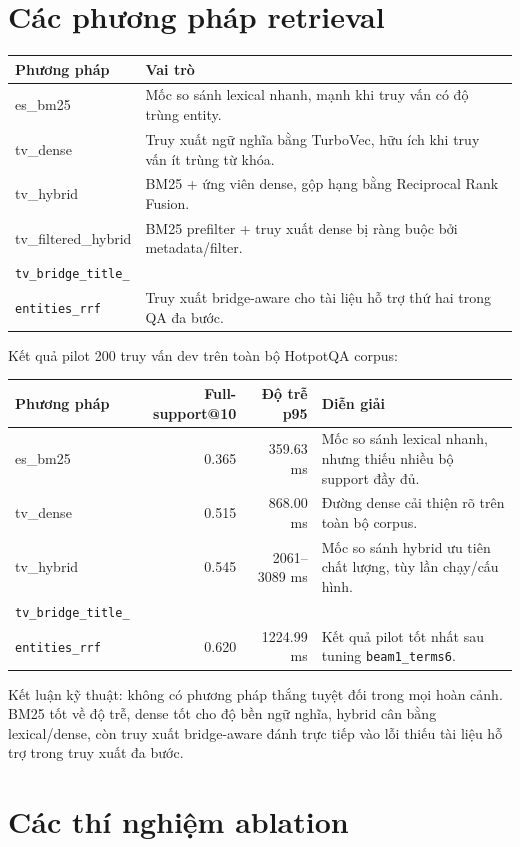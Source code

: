 \documentclass[11pt,a4paper]{article}
\newcommand{\bridgecell}{\texttt{tv\_bridge\_title\_}\\\texttt{entities\_rrf}}
\begin{document}
\section{Các phương pháp retrieval}

\begin{tabularx}{\textwidth}{>{\ttfamily\raggedright\arraybackslash}p{} Y}
\toprule
Phương pháp & Vai trò \\
\midrule
es\_bm25 & Mốc so sánh lexical nhanh, mạnh khi truy vấn có độ trùng entity. \\
tv\_dense & Truy xuất ngữ nghĩa bằng TurboVec, hữu ích khi truy vấn ít trùng từ khóa. \\
tv\_hybrid & BM25 + ứng viên dense, gộp hạng bằng Reciprocal Rank Fusion. \\
tv\_filtered\_hybrid & BM25 prefilter + truy xuất dense bị ràng buộc bởi metadata/filter. \\
\bridgecell & Truy xuất bridge-aware cho tài liệu hỗ trợ thứ hai trong QA đa bước. \\
\bottomrule
\end{tabularx}

Kết quả pilot 200 truy vấn dev trên toàn bộ HotpotQA corpus:

\begin{tabularx}{\textwidth}{>{\ttfamily\raggedright\arraybackslash}p{} r r Y}
\toprule
Phương pháp & Full-support@10 & Độ trễ p95 & Diễn giải \\
\midrule
es\_bm25 & 0.365 & 359.63 ms & Mốc so sánh lexical nhanh, nhưng thiếu nhiều bộ support đầy đủ. \\
tv\_dense & 0.515 & 868.00 ms & Đường dense cải thiện rõ trên toàn bộ corpus. \\
tv\_hybrid & 0.545 & 2061--3089 ms & Mốc so sánh hybrid ưu tiên chất lượng, tùy lần chạy/cấu hình. \\
\bridgecell & 0.620 & 1224.99 ms & Kết quả pilot tốt nhất sau tuning \texttt{beam1\_terms6}. \\
\bottomrule
\end{tabularx}

Kết luận kỹ thuật: không có phương pháp thắng tuyệt đối trong mọi hoàn cảnh. BM25 tốt về độ trễ,
dense tốt cho độ bền ngữ nghĩa, hybrid cân bằng lexical/dense, còn truy xuất bridge-aware
đánh trực tiếp vào lỗi thiếu tài liệu hỗ trợ trong truy xuất đa bước.

\section{Các thí nghiệm ablation}
\end{document}
